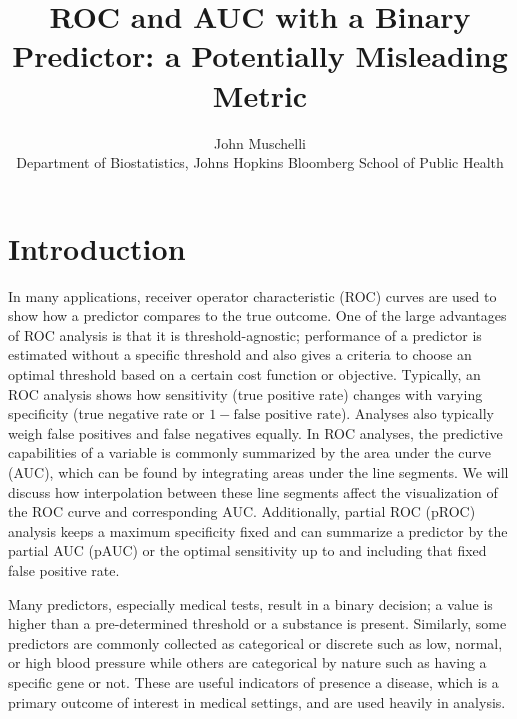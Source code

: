 \documentclass[article]{jss}
\author{
John Muschelli\\Department of Biostatistics, Johns Hopkins Bloomberg School of Public
Health
}
\title{ROC and AUC with a Binary Predictor: a Potentially Misleading Metric}
\begin{document}
\hypertarget{introduction}{%
\section{Introduction}\label{introduction}}

In many applications, receiver operator characteristic (ROC) curves are
used to show how a predictor compares to the true outcome. One of the
large advantages of ROC analysis is that it is threshold-agnostic;
performance of a predictor is estimated without a specific threshold and
also gives a criteria to choose an optimal threshold based on a certain
cost function or objective. Typically, an ROC analysis shows how
sensitivity (true positive rate) changes with varying specificity (true
negative rate or \(1 - \text{false positive rate}\)). Analyses also
typically weigh false positives and false negatives equally. In ROC
analyses, the predictive capabilities of a variable is commonly
summarized by the area under the curve (AUC), which can be found by
integrating areas under the line segments. We will discuss how
interpolation between these line segments affect the visualization of
the ROC curve and corresponding AUC. Additionally, partial ROC (pROC)
analysis keeps a maximum specificity fixed and can summarize a predictor
by the partial AUC (pAUC) or the optimal sensitivity up to and including
that fixed false positive rate.

Many predictors, especially medical tests, result in a binary decision;
a value is higher than a pre-determined threshold or a substance is
present. Similarly, some predictors are commonly collected as
categorical or discrete such as low, normal, or high blood pressure
while others are categorical by nature such as having a specific gene or
not. These are useful indicators of presence a disease, which is a
primary outcome of interest in medical settings, and are used heavily in
analysis.
\end{document}
